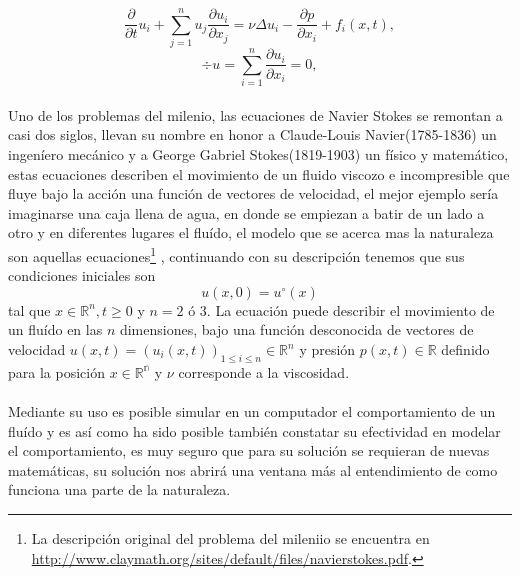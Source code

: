 \documentclass{article}
\begin{document}
$$\frac{\partial}{\partial t} u_i +  \sum_{j=1}^{n} u_j \frac{\partial u_i}{\partial x_j} = \nu \Delta u_i - \frac{\partial p}{\partial x_i} + f_i(x,t),$$
$$ \div u = \sum_{i=1}^{n} \frac{\partial u_i}{\partial x_i} = 0,$$

\paragraph{} Uno de los problemas del milenio, las ecuaciones de Navier Stokes se remontan a casi dos siglos, llevan su nombre en honor a Claude-Louis Navier(1785-1836) un ingeníero mecánico y a George Gabriel Stokes(1819-1903) un físico y matemático, estas ecuaciones describen el movimiento de un fluido viscozo e incompresible que fluye bajo la acción una función de vectores de velocidad, el mejor ejemplo sería imaginarse una caja llena de agua, en donde se empiezan a batir de un lado a otro y en diferentes lugares el fluído, el modelo que se acerca mas la naturaleza son aquellas ecuaciones\footnote{La descripción original del problema del mileniio se encuentra en \url{http://www.claymath.org/sites/default/files/navierstokes.pdf}.}
, continuando con su descripción tenemos que sus condiciones iniciales son
$$u(x,0) = u^{\circ}(x)$$
tal que $x \in \mathbb{R}^n, t \geq 0$ y $n = 2$ ó $3$. La ecuación puede describir el movimiento de un fluído en las $n$ dimensiones, bajo una función desconocida de vectores de velocidad $u(x,t) = (u_i(x,t))_{1 \leq i \leq n} \in \mathbb{R}^n$ y presión $p(x,t) \in \mathbb{R}$ definido para la posición $x \in \mathbb{R^n}$ y $\nu$ corresponde a la viscosidad.

\paragraph{} Mediante su uso es posible simular en un computador el comportamiento de un fluído y es así como ha sido posible también constatar su efectividad en modelar el comportamiento, es muy seguro que para su solución se requieran de nuevas matemáticas, su solución nos abrirá una ventana más al entendimiento de como funciona una parte de la naturaleza.
\end{document}
